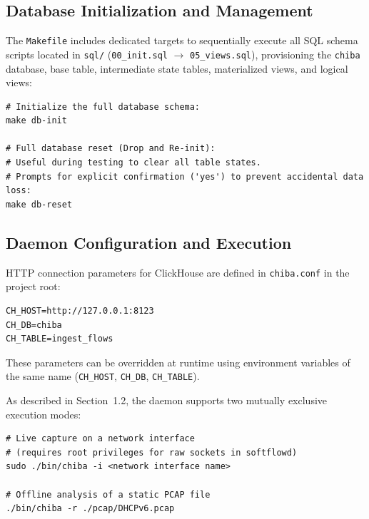 \documentclass[11pt,a4paper]{article}
\newenvironment{codebox}[1][]{%
    \begin{tcolorbox}[
        colback=codebg,
        colframe=codeframe,
        boxrule=0.6pt,
        arc=1.5mm,
        left=3mm,
        right=3mm,
        top=2mm,
        bottom=2mm,
        fonttitle=\sffamily\bfseries\footnotesize,
        coltitle=chibadark,
        colbacktitle=codeframe!50!white,
        #1
    ]
}{%
    \end{tcolorbox}
}
\begin{document}
\subsection{Database Initialization and Management}
The \texttt{Makefile} includes dedicated targets to sequentially execute all SQL schema scripts located in \texttt{sql/} (\texttt{00\_init.sql} $\rightarrow$ \texttt{05\_views.sql}), provisioning the \texttt{chiba} database, base table, intermediate state tables, materialized views, and logical views:
\begin{codebox}[title={Database Schema Management}]
\footnotesize
\begin{verbatim}
# Initialize the full database schema:
make db-init

# Full database reset (Drop and Re-init):
# Useful during testing to clear all table states.
# Prompts for explicit confirmation ('yes') to prevent accidental data loss:
make db-reset
\end{verbatim}
\end{codebox}

\subsection{Daemon Configuration and Execution}
HTTP connection parameters for ClickHouse are defined in \texttt{chiba.conf} in the project root:
\begin{codebox}[title={\texttt{chiba.conf}}]
\footnotesize
\begin{verbatim}
CH_HOST=http://127.0.0.1:8123
CH_DB=chiba
CH_TABLE=ingest_flows
\end{verbatim}
\end{codebox}
These parameters can be overridden at runtime using environment variables of the same name (\texttt{CH\_HOST}, \texttt{CH\_DB}, \texttt{CH\_TABLE}).

As described in Section~1.2, the daemon supports two mutually exclusive execution modes:
\begin{codebox}[title={Running CHIBA}]
\footnotesize
\begin{verbatim}
# Live capture on a network interface
# (requires root privileges for raw sockets in softflowd)
sudo ./bin/chiba -i <network interface name>

# Offline analysis of a static PCAP file
./bin/chiba -r ./pcap/DHCPv6.pcap
\end{verbatim}
\end{codebox}
\end{document}

